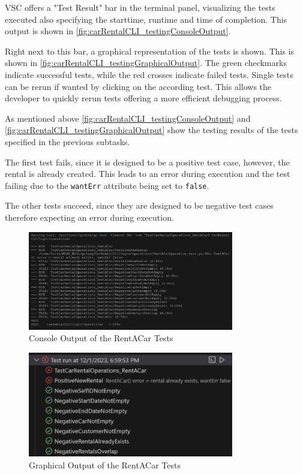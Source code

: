VSC offers a "Test Result" bar in the terminal panel, visualizing the tests executed also specifying the starttime, runtime and time of completion.
This output is shown in \autoref{fig:carRentalCLI_testingConsoleOutput}.

Right next to this bar, a graphical representation of the tests is shown.
This is shown in \autoref{fig:carRentalCLI_testingGraphicalOutput}.
The green checkmarks indicate successful tests, while the red crosses indicate failed tests.
Single tests can be rerun if wanted by clicking on the according test.
This allows the developer to quickly rerun tests offering a more efficient debugging process.

As mentioned above \autoref{fig:carRentalCLI_testingConsoleOutput} and \autoref{fig:carRentalCLI_testingGraphicalOutput} show the testing results of the tests specified in the previous subtasks.

The first test fails, since it is designed to be a positive test case, however, the rental is already created.
This leads to an error during execution and the test failing due to the \texttt{wantErr} attribute being set to \texttt{false}.

The other tests succeed, since they are designed to be negative test cases therefore expecting an error during execution.

\begin{figure}
      \centering
      \includegraphics[width=0.8\textwidth]{figures/goLang/carRental/carRentalCLI/carRentalCLI_testingConsoleOutput.png}
      \caption{Console Output of the RentACar Tests}
      \label{fig:carRentalCLI_testingConsoleOutput}
\end{figure}
\begin{figure}
      \centering
      \includegraphics[width=0.8\textwidth]{figures/goLang/carRental/carRentalCLI/carRentalCLI_testingGraphicalOutput.png}
      \caption{Graphical Output of the RentACar Tests}
      \label{fig:carRentalCLI_testingGraphicalOutput}
\end{figure}



